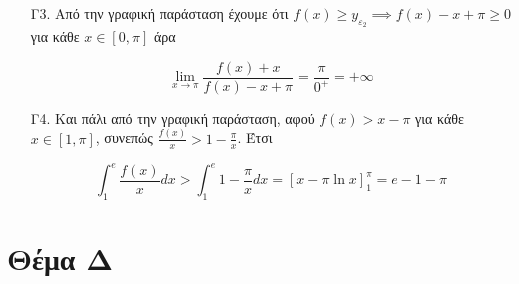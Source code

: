 \documentclass[12pt]{article}
\begin{document}
\begin{enumerate}
      \item [Γ3.] Από την γραφική παράσταση έχουμε ότι $f(x)\ge y_{ε_2} \implies f(x)-x+\pi \ge 0$ για κάθε $x\in[0,\pi]$ άρα

      $$\lim_{x\to \pi} \frac{f(x)+x}{f(x)-x+\pi}=\frac{\pi}{0^+}=+\infty$$

      \item [Γ4.] Και πάλι από την γραφική παράσταση, αφού $f(x)> x -\pi$ για κάθε $x\in[1,\pi]$, συνεπώς $\frac{f(x)}{x}> 1-\frac{\pi}{x}$. Έτσι

      $$\int_{1}^{e}\frac{f(x)}{x}dx > \int_{1}^{e}1-\frac{\pi}{x}dx = [x-\pi\ln x]_1^{\pi} = e-1-\pi$$
    \end{enumerate}

    \section*{Θέμα Δ}
\end{document}
